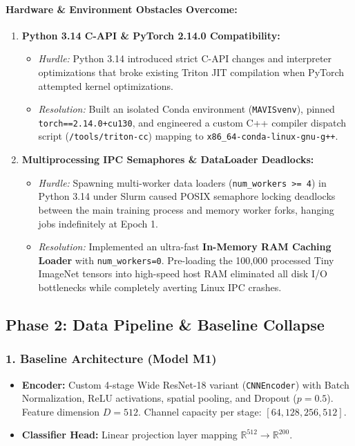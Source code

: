 \documentclass[11pt,a4paper]{article}
\begin{document}
    \paragraph{Hardware \& Environment Obstacles Overcome:}
    \begin{enumerate}[leftmargin=*]
        \item \textbf{Python 3.14 C-API \& PyTorch 2.14.0 Compatibility:}
        \begin{itemize}
            \item \textit{Hurdle:} Python 3.14 introduced strict C-API changes and interpreter optimizations that broke existing Triton JIT compilation when PyTorch attempted kernel optimizations.
            \item \textit{Resolution:} Built an isolated Conda environment (\texttt{MAVISvenv}), pinned \texttt{torch==2.14.0+cu130}, and engineered a custom C++ compiler dispatch script (\texttt{/tools/triton-cc}) mapping to \texttt{x86\_64-conda-linux-gnu-g++}.
        \end{itemize}
        \item \textbf{Multiprocessing IPC Semaphores \& DataLoader Deadlocks:}
        \begin{itemize}
            \item \textit{Hurdle:} Spawning multi-worker data loaders (\texttt{num\_workers >= 4}) in Python 3.14 under Slurm caused POSIX semaphore locking deadlocks between the main training process and memory worker forks, hanging jobs indefinitely at Epoch 1.
            \item \textit{Resolution:} Implemented an ultra-fast \textbf{In-Memory RAM Caching Loader} with \texttt{num\_workers=0}. Pre-loading the 100,000 processed Tiny ImageNet tensors into high-speed host RAM eliminated all disk I/O bottlenecks while completely averting Linux IPC crashes.
        \end{itemize}
    \end{enumerate}

    \subsection{Phase 2: Data Pipeline \& Baseline Collapse}

    \subsubsection{1. Baseline Architecture (Model M1)}
    \begin{itemize}[leftmargin=*]
        \item \textbf{Encoder:} Custom 4-stage Wide ResNet-18 variant (\texttt{CNNEncoder}) with Batch Normalization, ReLU activations, spatial pooling, and Dropout ($p=0.5$). Feature dimension $D = 512$. Channel capacity per stage: $[64, 128, 256, 512]$.
        \item \textbf{Classifier Head:} Linear projection layer mapping $\mathbb{R}^{512} \to \mathbb{R}^{200}$.
    \end{itemize}
\end{document}
